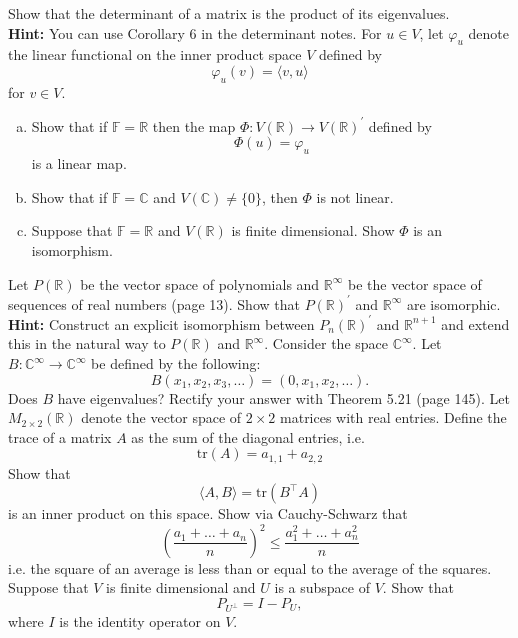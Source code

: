 \documentclass[11pt]{exam}
\theoremstyle{definition}
\newcommand{\tr}{\text{tr}}
\begin{document}
\begin{questions}
\question Show that the determinant of a matrix is the product of its eigenvalues.\vspace{-.1in}\\

{\bf Hint: }You can use Corollary 6 in the determinant notes. 
\vfill
\question For $u\in V$, let $\varphi_u$ denote the linear functional on the inner product space $V$ defined by 
\[\varphi_u(v)=\langle v,u\rangle\] 
for $v\in V$. 
\begin{enumerate}[(a)]
\item Show that if $\mathbb{F}=\mathbb{R}$ then the map $\Phi: V(\mathbb{R})\rightarrow V(\mathbb{R})^\prime$ defined by 
\[\Phi(u)=\varphi_u\]
is a linear map. 
\item Show that if $\mathbb{F}=\mathbb{C}$ and $V(\mathbb{C})\neq \{0\}$, then $\Phi$ is not linear. 
\item Suppose that $\mathbb{F}=\mathbb{R}$ and $V(\mathbb{R})$ is finite dimensional. Show $\Phi$ is an isomorphism. 
\end{enumerate}
\vfill
\question Let $P(\mathbb{R})$ be the vector space of polynomials and $\mathbb{R}^\infty$ be the vector space of sequences of real numbers (page 13). Show that $P(\mathbb{R})^\prime$ and $\mathbb{R}^\infty$ are isomorphic. \vspace{-.1in}\\

{\bf Hint: }Construct an explicit isomorphism between $P_n(\mathbb{R})^\prime$ and $\mathbb{R}^{n+1}$ and extend this in the natural way to $P(\mathbb{R})$ and $\mathbb{R}^\infty$. 
\vfill
\question Consider the space $\mathbb{C}^\infty$. Let $B:\mathbb{C}^\infty\rightarrow \mathbb{C}^\infty$ be defined by the following:
\[B(x_1, x_2, x_3,\ldots) =(0, x_1, x_2, \ldots).\]
Does $B$ have eigenvalues? Rectify your answer with Theorem 5.21 (page 145).
\vfill
\question Let $M_{2\times 2}(\mathbb{R})$ denote the vector space of $2\times 2$ matrices with real entries.  Define the trace of a matrix $A$  as the sum of the diagonal entries, i.e. 
\[\tr(A)=a_{1,1}+a_{2,2}\]
Show that 
\[\langle A, B\rangle=\tr(B^\top A)\]
is an inner product on this space. 
\vfill
\question Show via Cauchy-Schwarz that 
\[\left(\frac{a_1+\ldots +a_n}{n}\right)^2\leq \frac{a_1^2+\ldots+a_n^2}{n}\]
i.e. the square of an average is less than or equal to the average of the squares. 
\question Suppose that $V$ is finite dimensional and $U$ is a subspace of $V$. Show that 
\[P_{U^\bot}=I-P_U,\]
where $I$ is the identity operator on $V$. 
\vfill
\end{questions}
\end{document}
